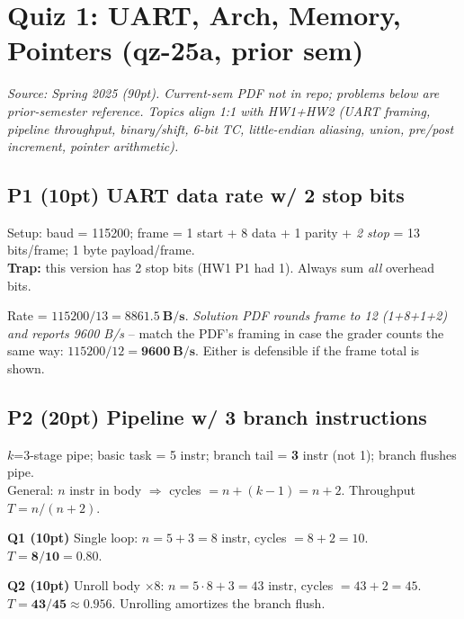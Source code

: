 \section{Quiz 1: UART, Arch, Memory, Pointers (qz-25a, prior sem)}

\textit{Source: Spring 2025  (90pt). Current-sem PDF not in repo; problems below are prior-semester reference. Topics align 1:1 with HW1+HW2 (UART framing, pipeline throughput, binary/shift, 6-bit TC, little-endian aliasing, union, pre/post increment, pointer arithmetic).}

\subsection{P1 (10pt) UART data rate w/ 2 stop bits}
Setup: baud = 115200; frame = 1 start + 8 data + 1 parity + \emph{2 stop} = 13 bits/frame; 1 byte payload/frame.\\
\textbf{Trap:} this version has 2 stop bits (HW1 P1 had 1). Always sum \emph{all} overhead bits.
\begin{qp}
Rate = $115200 / 13 = \mathbf{8861.5~B/s}$. \emph{Solution PDF rounds frame to 12 (1+8+1+2) and reports 9600 B/s} -- match the PDF's framing in case the grader counts the same way: $115200/12 = \mathbf{9600~B/s}$. Either is defensible if the frame total is shown.
\end{qp}

\subsection{P2 (20pt) Pipeline w/ 3 branch instructions}
$k$=3-stage pipe; basic task = 5 instr; branch tail = \textbf{3} instr (not 1); branch flushes pipe.\\
General: $n$ instr in body $\Rightarrow$ cycles $= n + (k{-}1) = n + 2$. Throughput $T = n/(n+2)$.
\begin{qp}\textbf{Q1 (10pt)} Single loop: $n = 5+3 = 8$ instr, cycles $= 8+2 = 10$. $T = \mathbf{8/10 = 0.80}$.\end{qp}
\begin{qp}\textbf{Q2 (10pt)} Unroll body $\times 8$: $n = 5\!\cdot\!8 + 3 = 43$ instr, cycles $= 43+2 = 45$. $T = \mathbf{43/45 \approx 0.956}$. Unrolling amortizes the branch flush.\end{qp}

